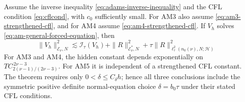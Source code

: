 \documentclass[11pt]{article}
\begin{document}
\begin{thm}
\label{thm:adams-moulton-stability}
Assume the inverse inequality \eqref{eq:adams-inverse-inequality} and the CFL
condition \eqref{eq:cflcond}, with \(c_0\) sufficiently small. For AM3 also
assume \eqref{eq:am3-strengthened-cfl}, and for AM4 assume
\eqref{eq:am4-strengthened-cfl}. If \(V_h\) solves
\eqref{eq:am-general-forced-equation}, then
\begin{equation}
\|V_h\|_{\mathcal E_\nu,N}^2
\lesssim\mathcal I_{\tau}(V_h)
+\|R\|_{\mathcal E_\nu^*,N}^2
+\tau\|R\|_{\ell_{\tau}^2(n_0(\nu),N;\mathcal H)}^2
\label{eq:adams-stability-right-hand-side}
\end{equation}
For AM3 and AM4, the hidden constant depends exponentially on
\(TC_{2(\nu-1)/(2\nu-3)}^{\,2\nu-3}\). For AM5 it is independent of a
strengthened CFL constant.
The theorem requires only \(0<\delta\le C_{\delta}h\); hence all three
conclusions include the symmetric positive definite normal-equation choice
\(\delta=b_0\tau\) under
their stated CFL conditions.
\end{thm}
\end{document}
